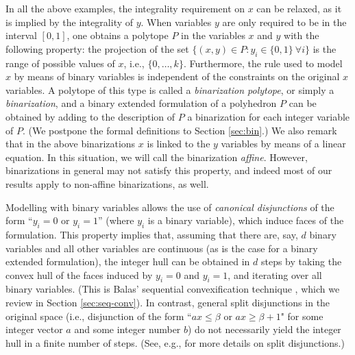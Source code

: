 \documentclass[11pt,a4paper]{article}
\newcommand{\1}{\textbf{1}}
\begin{document}
In all the above examples, the integrality requirement on $x$ can be relaxed, as it is implied by the integrality of $y$. When variables $y$ are only required to be in the interval $[0,1]$, one obtains a polytope $P$ in the variables $x$ and $y$ with the following property: the projection of the set $\{(x,y)\in P:y_i\in\{0,1\}\:\forall i\}$ is the range of possible values of $x$, i.e., $\{0,\dots,k\}$. Furthermore, the rule used to model $x$ by means of binary variables is independent of the constraints on the original $x$ variables. A polytope of this type is called a {\em binarization polytope}, or simply a {\em binarization}, and a binary extended formulation of a polyhedron $P$ can be obtained by adding to the description of $P$ a binarization for each integer variable of $P$. (We postpone the formal definitions to Section \ref{sec:bin}.) %
We also remark that in the above binarizations $x$ is linked to the $y$ variables by means of a linear equation. In this situation, we will call the binarization {\em affine}. However, binarizations in general may not satisfy this property, and indeed most of our results apply to non-affine binarizations, as well.\medskip


Modelling with binary variables allows the use of {\em canonical disjunctions} of the form ``$y_i=0$ or $y_i=1$'' (where $y_i$ is a binary variable), which induce faces of the formulation. 
This property implies that, assuming that there are, say, $d$ binary variables and all other variables are continuous (as is the case for a binary extended formulation), the integer hull can be obtained in $d$ steps by taking the convex hull of the faces induced by $y_i=0$ and $y_i=1$, and iterating over all binary variables. (This is Balas' sequential convexification technique \cite{balas1998disjunctive}, which we review in Section \ref{sec:seq-conv}). In contrast, general split disjunctions in the original space (i.e., disjunction of the form ``$ax\le\beta$ or $ax\ge\beta+1$" for some integer vector $a$ and some integer number $b$) do not necessarily yield the integer hull in a finite number of steps. (See, e.g., \cite{conforti2014integer} for more details on split disjunctions.)
\end{document}
